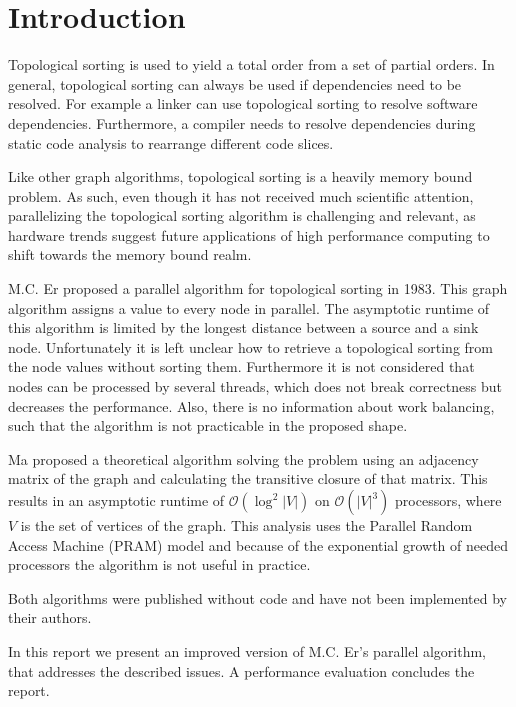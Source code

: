 \section{Introduction}\label{sec:intro}

Topological sorting is used to yield a total order from a set of partial orders. In general, topological sorting can always be used if dependencies need to be resolved. For example 
 a linker can use topological sorting to resolve software dependencies. Furthermore, a compiler needs to resolve dependencies during static code analysis to rearrange different code slices.

Like other graph algorithms, topological sorting is a heavily memory bound problem. As such, even though it has not received much scientific attention, parallelizing the topological sorting algorithm is challenging and relevant, as hardware trends suggest future applications of high performance computing to shift towards the memory bound realm.


M.C. Er \cite{er1983parallel} proposed a parallel algorithm for topological sorting in 1983. This graph algorithm assigns a value to every node in parallel. The asymptotic runtime of this algorithm is limited by the longest distance between a source and a sink node. Unfortunately it is left unclear how to retrieve a topological sorting from the node values without sorting them. Furthermore it is not considered that nodes can be processed by several threads, which does not break correctness but decreases the performance. Also, there is no information about work balancing, such that the algorithm is not practicable in the proposed shape.

Ma \cite{ma1997efficient} proposed a theoretical algorithm solving the problem using an adjacency matrix of the graph and calculating the transitive closure of that matrix. This results in an asymptotic runtime  of $\mathcal{O}(\log^2 |V|)$ on $\mathcal{O}(|V|^3)$ processors, where $V$ is the set of vertices of the graph. This analysis uses the Parallel Random Access Machine (PRAM) model and because of the exponential growth of needed processors the algorithm is not useful in practice.

Both algorithms were published without code and have not been implemented by their authors.

In this report we present an improved version of M.C. Er's parallel algorithm, that addresses the described issues. A performance evaluation concludes the report.


